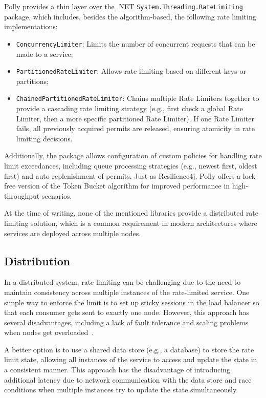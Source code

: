 Polly provides a thin layer over the .NET \texttt{System.Threading.RateLimiting}~\cite{microsoft-rate-limiting-dotnet} package, which includes, besides the algorithm-based, the following rate limiting implementations:
\begin{itemize}
    \item \texttt{ConcurrencyLimiter}: Limits the number of concurrent requests that can be made to a service;
    \item \texttt{PartitionedRateLimiter}: Allows rate limiting based on different keys or partitions;
    \item \texttt{ChainedPartitionedRateLimiter}:
    Chains multiple Rate Limiters together to provide a cascading rate limiting strategy (e.g., first check a global Rate Limiter, then a more specific partitioned Rate Limiter).
    If one Rate Limiter fails, all previously acquired permits are released, ensuring atomicity in rate limiting decisions.
\end{itemize}

Additionally, the package allows configuration of custom policies for handling rate limit exceedances, including queue processing strategies (e.g., newest first, oldest first) and auto-replenishment of permits.
Just as Resilience4j, Polly offers a lock-free version of the Token Bucket algorithm for improved performance in high-throughput scenarios.

At the time of writing, none of the mentioned libraries provide a distributed rate limiting solution,
which is a common requirement in modern architectures where services are deployed across multiple nodes.

\subsection{Distribution}\label{subsec:rate-limiter-distribution}

In a distributed system,
rate limiting can be challenging due to the need
to maintain consistency across multiple instances of the rate-limited service.
One simple way to enforce the limit is
to set up sticky sessions in the load balancer so that each consumer gets sent to exactly one node.
However, this approach has several disadvantages,
including a lack of fault tolerance and scaling problems when nodes get overloaded~\cite{kong-rate-limiting}.

A better option is to use a shared data store (e.g., a database) to store the rate limit state,
allowing all instances of the service to access and update the state in a consistent manner.
This approach has the disadvantage
of introducing additional latency due to network communication with the data store and race conditions when
multiple instances try to update the state simultaneously.

